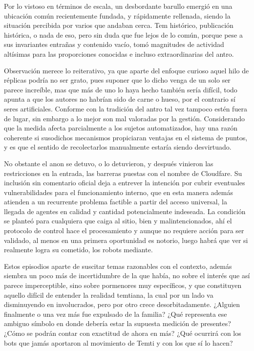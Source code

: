 \documentclass[
]{book}
\begin{document}
Por lo vistoso en términos de escala, un desbordante barullo emergió en una ubicación común recientemente fundada, y rápidamente rellenada, siendo la situación percibida por varios que andaban cerca. Tem histórico, publicación histórica, o nada de eso, pero sin duda que fue lejos de lo común, porque pese a sus invariantes entrañas y contenido vacío, tomó magnitudes de actividad altísimas para las proporciones conocidas e incluso extraordinarias del antro.

Observación merece lo reiterativo, ya que aparte del enfoque curioso aquel hilo de réplicas podría no ser grato, pues suponer que lo dicho venga de un solo ser parece increíble, mas que más de uno lo haya hecho también sería difícil, todo apunta a que los autores no habrían sido de carne o hueso, por el contrario sí seres artificiales. Conforme con la tradición del antro tal vez tampoco estén fuera de lugar, sin embargo a lo mejor son mal valoradas por la gestión. Considerando que la medida afecta parcialmente a los sujetos automatizados, hay una razón coherente si susodichos mecanismos propiciaran ventajas en el sistema de puntos, y es que el sentido de recolectarlos manualmente estaría siendo desvirtuado.

No obstante el anon se detuvo, o lo detuvieron, y después vinieron las restricciones en la entrada, las barreras puestas con el nombre de Cloudfare. Su inclusión sin comentario oficial deja a entrever la intención por cubrir eventuales vulnerabilidades para el funcionamiento interno, que en esta manera además atienden a un recurrente problema factible a partir del acceso universal, la llegada de agentes en calidad y cantidad potencialmente indeseada. La condición se planteó para cualquiera que caiga al sitio, bien y malintencionados, ahí el protocolo de control hace el procesamiento y aunque no requiere acción para ser validado, al menos en una primera oportunidad es notorio, luego habrá que ver si realmente logra su cometido, los robots mediante.

Estos episodios aparte de suscitar temas razonables con el contexto, además siembra un poco más de incertidumbre de la que había, no sobre el interés que así parece imperceptible, sino sobre pormenores muy específicos, y que constituyen aquello difícil de entender la realidad temtiana, la cual por un lado va disminuyendo en involucrados, pero por otro crece desorbitadamente. ¿Alguien finalmente o una vez más fue expulsado de la familia? ¿Qué representa ese ambiguo símbolo en donde debería estar la supuesta medición de presentes? ¿Cómo se podrán contar con exactitud de ahora en más? ¿Qué ocurrirá con los bots que jamás aportaron al movimiento de Temti y con los que sí lo hacen?
\end{document}
